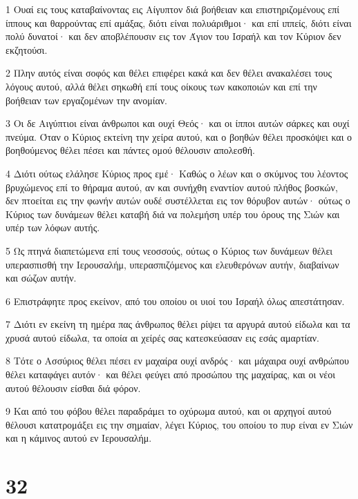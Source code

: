 \par 1 Ουαί εις τους καταβαίνοντας εις Αίγυπτον διά βοήθειαν και επιστηριζομένους επί ίππους και θαρρούντας επί αμάξας, διότι είναι πολυάριθμοι· και επί ιππείς, διότι είναι πολύ δυνατοί· και δεν αποβλέπουσιν εις τον Άγιον του Ισραήλ και τον Κύριον δεν εκζητούσι.
\par 2 Πλην αυτός είναι σοφός και θέλει επιφέρει κακά και δεν θέλει ανακαλέσει τους λόγους αυτού, αλλά θέλει σηκωθή επί τους οίκους των κακοποιών και επί την βοήθειαν των εργαζομένων την ανομίαν.
\par 3 Οι δε Αιγύπτιοι είναι άνθρωποι και ουχί Θεός· και οι ίπποι αυτών σάρκες και ουχί πνεύμα. Όταν ο Κύριος εκτείνη την χείρα αυτού, και ο βοηθών θέλει προσκόψει και ο βοηθούμενος θέλει πέσει και πάντες ομού θέλουσιν απολεσθή.
\par 4 Διότι ούτως ελάλησε Κύριος προς εμέ· Καθώς ο λέων και ο σκύμνος του λέοντος βρυχώμενος επί το θήραμα αυτού, αν και συνήχθη εναντίον αυτού πλήθος βοσκών, δεν πτοείται εις την φωνήν αυτών ουδέ συστέλλεται εις τον θόρυβον αυτών· ούτως ο Κύριος των δυνάμεων θέλει καταβή διά να πολεμήση υπέρ του όρους της Σιών και υπέρ των λόφων αυτής.
\par 5 Ως πτηνά διαπετώμενα επί τους νεοσσούς, ούτως ο Κύριος των δυνάμεων θέλει υπερασπισθή την Ιερουσαλήμ, υπερασπιζόμενος και ελευθερόνων αυτήν, διαβαίνων και σώζων αυτήν.
\par 6 Επιστράφητε προς εκείνον, από του οποίου οι υιοί του Ισραήλ όλως απεστάτησαν.
\par 7 Διότι εν εκείνη τη ημέρα πας άνθρωπος θέλει ρίψει τα αργυρά αυτού είδωλα και τα χρυσά αυτού είδωλα, τα οποία αι χείρές σας κατεσκεύασαν εις εσάς αμαρτίαν.
\par 8 Τότε ο Ασσύριος θέλει πέσει εν μαχαίρα ουχί ανδρός· και μάχαιρα ουχί ανθρώπου θέλει καταφάγει αυτόν· και θέλει φεύγει από προσώπου της μαχαίρας, και οι νέοι αυτού θέλουσιν είσθαι διά φόρον.
\par 9 Και από του φόβου θέλει παραδράμει το οχύρωμα αυτού, και οι αρχηγοί αυτού θέλουσι κατατρομάξει εις την σημαίαν, λέγει Κύριος, του οποίου το πυρ είναι εν Σιών και η κάμινος αυτού εν Ιερουσαλήμ.

\chapter{32}

